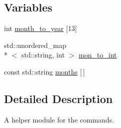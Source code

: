 \subsection*{Variables}
\begin{DoxyCompactItemize}
\item 
int \hyperlink{group__UTIL_ga825bc9e6f0accf92a1b07431568a397c}{month\-\_\-to\-\_\-year} \mbox{[}13\mbox{]}
\item 
std\-::unordered\-\_\-map\\*
$<$ std\-::string, int $>$ \hyperlink{group__UTIL_ga044d0402087a045aabd076a5126699d2}{mon\-\_\-to\-\_\-int}
\item 
const std\-::string \hyperlink{group__UTIL_ga88a2cb2e6ccec0c5df742e71dc28835b}{months} \mbox{[}$\,$\mbox{]}
\end{DoxyCompactItemize}


\subsection{Detailed Description}
A helper module for the commands. 